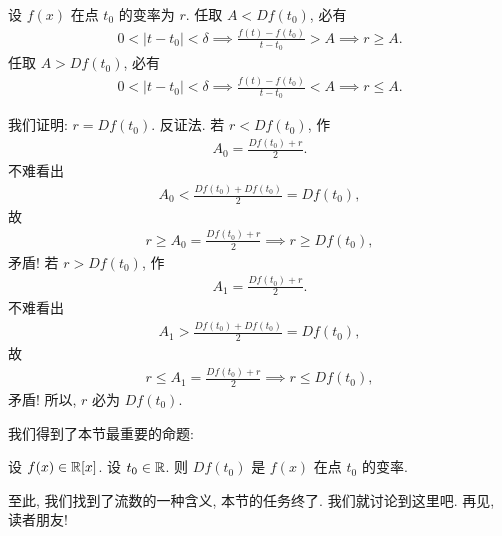 设 $f(x)$ 在点 $t_0$ 的变率为 $r$. 任取 $A < Df(t_0)$, 必有
\begin{align*}
    0 < |t - t_0| < \delta \implies \frac{f(t) - f(t_0)}{t - t_0} > A \implies r \geq A.
\end{align*}
任取 $A > Df(t_0)$, 必有
\begin{align*}
    0 < |t - t_0| < \delta \implies \frac{f(t) - f(t_0)}{t - t_0} < A \implies r \leq A.
\end{align*}

我们证明: $r = Df(t_0)$. 反证法. 若 $r < Df(t_0)$, 作
\begin{align*}
    A_0 = \frac{Df(t_0) + r}{2}.
\end{align*}
不难看出
\begin{align*}
    A_0 < \frac{Df(t_0) + Df(t_0)}{2} = Df(t_0),
\end{align*}
故
\begin{align*}
    r \geq A_0 = \frac{Df(t_0) + r}{2} \implies r \geq Df(t_0),
\end{align*}
矛盾! 若 $r > Df(t_0)$, 作
\begin{align*}
    A_1 = \frac{Df(t_0) + r}{2}.
\end{align*}
不难看出
\begin{align*}
    A_1 > \frac{Df(t_0) + Df(t_0)}{2} = Df(t_0),
\end{align*}
故
\begin{align*}
    r \leq A_1 = \frac{Df(t_0) + r}{2} \implies r \leq Df(t_0),
\end{align*}
矛盾! 所以, $r$ 必为 $Df(t_0)$.

我们得到了本节最重要的命题:

\begin{proposition}
    设 $f (x) \in \mathbb{R}[x]$. 设 $t_0 \in \mathbb{R}$. 则 $Df(t_0)$ 是 $f(x)$ 在点 $t_0$ 的变率.
\end{proposition}

至此, 我们找到了流数的一种含义, 本节的任务终了. 我们就讨论到这里吧. 再见, 读者朋友!
